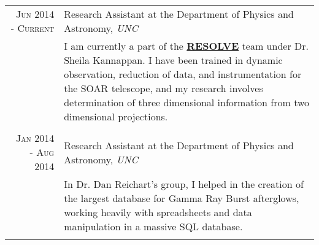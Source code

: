 \documentclass[a4paper,10pt]{article} %
\begin{document}
\begin{tabular}{r|p{11cm}}
\textsc{Jun 2014 - Current} & Research Assistant at the Department of Physics and Astronomy, \emph{UNC} \\ 
& \footnotesize{I am currently a part of the \textbf{\href{http://resolve.astro.unc.edu/}{RESOLVE}} team under Dr. Sheila Kannappan. I have been trained in dynamic observation, reduction of data, and instrumentation for the SOAR telescope, and my research involves determination of three dimensional information from two dimensional projections.}\\
\multicolumn{2}{c}{} \\


\textsc{Jan 2014 - Aug 2014} & Research Assistant at the Department of Physics and Astronomy, \emph{UNC} \\ 
& \footnotesize{In Dr. Dan Reichart's group, I helped in the creation of the largest database for Gamma Ray Burst afterglows, working heavily with spreadsheets and data manipulation in a massive SQL database.}\\
\multicolumn{2}{c}{} \\



\end{tabular}
\end{document}
